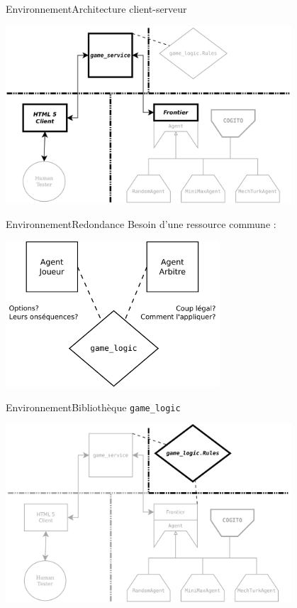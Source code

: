 \begin{frame}{Environnement}{Architecture client-serveur}
\begin{center}
\includegraphics[width=0.8\textwidth]{img/william/archi_clients_serveur}\\
\end{center}
\end{frame}
\begin{frame}{Environnement}{Redondance}
Besoin d'une ressource commune :
\begin{center}
\includegraphics[width=0.6\textwidth]{img/william/game_logic_shared}\\
\end{center}
\end{frame}
\begin{frame}{Environnement}{Bibliothèque \texttt{game\_logic}}
\begin{center}
\includegraphics[width=0.8\textwidth]{img/william/archi_lib}\\
\end{center}
\end{frame}
